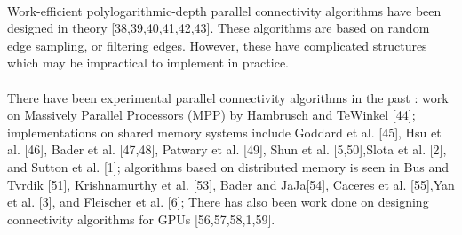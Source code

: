 \documentclass[]{article}
\begin{document}
 \paragraph{}
 Work-efficient polylogarithmic-depth parallel connectivity algorithms have been designed in theory [38,39,40,41,42,43]. These algorithms are based on random edge sampling, or filtering edges. However, these have complicated structures which may be impractical to implement in practice. 
 
 \paragraph{}
 There have been experimental parallel connectivity algorithms in the past : work on Massively Parallel Processors (MPP) by Hambrusch and TeWinkel [44]; implementations on shared memory systems include Goddard et al. [45], Hsu et al. [46], Bader et al. [47,48], Patwary et al. [49], Shun et al. [5,50],Slota et al. [2], and Sutton et al. [1]; algorithms based on distributed memory is seen in Bus and Tvrdik [51], Krishnamurthy et al. [53], Bader and JaJa[54], Caceres et al. [55],Yan et al. [3], and Fleischer et al. [6]; There has also been work done on designing connectivity algorithms for GPUs [56,57,58,1,59].
 
\end{document}

